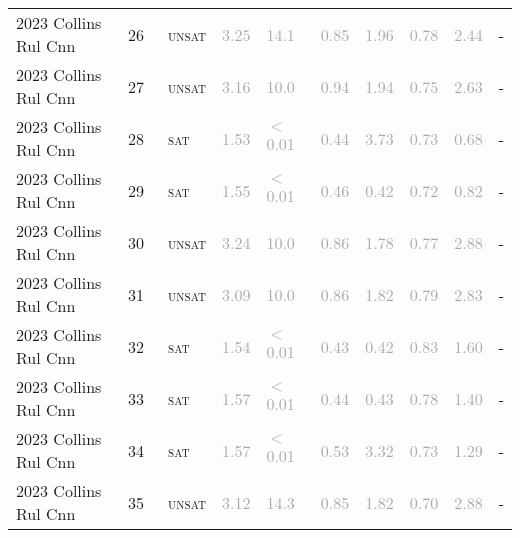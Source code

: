 \begin{center}
{\begin{longtable}{@{}llllllllll@{}}
2023 Collins Rul Cnn & 26 & ~\textsc{unsat} & \textcolor{darkgray}{3.25} & \textcolor{darkgray}{14.1} & \textcolor{darkgray}{0.85} & \textcolor{darkgray}{1.96} & \textcolor{darkgray}{0.78} & \textcolor{darkgray}{2.44} & - \\
2023 Collins Rul Cnn & 27 & ~\textsc{unsat} & \textcolor{darkgray}{3.16} & \textcolor{darkgray}{10.0} & \textcolor{darkgray}{0.94} & \textcolor{darkgray}{1.94} & \textcolor{darkgray}{0.75} & \textcolor{darkgray}{2.63} & - \\
2023 Collins Rul Cnn & 28 & ~\textsc{sat} & \textcolor{darkgray}{1.53} & \textcolor{darkgray}{$<$0.01} & \textcolor{darkgray}{0.44} & \textcolor{darkgray}{3.73} & \textcolor{darkgray}{0.73} & \textcolor{darkgray}{0.68} & - \\
2023 Collins Rul Cnn & 29 & ~\textsc{sat} & \textcolor{darkgray}{1.55} & \textcolor{darkgray}{$<$0.01} & \textcolor{darkgray}{0.46} & \textcolor{darkgray}{0.42} & \textcolor{darkgray}{0.72} & \textcolor{darkgray}{0.82} & - \\
2023 Collins Rul Cnn & 30 & ~\textsc{unsat} & \textcolor{darkgray}{3.24} & \textcolor{darkgray}{10.0} & \textcolor{darkgray}{0.86} & \textcolor{darkgray}{1.78} & \textcolor{darkgray}{0.77} & \textcolor{darkgray}{2.88} & - \\
2023 Collins Rul Cnn & 31 & ~\textsc{unsat} & \textcolor{darkgray}{3.09} & \textcolor{darkgray}{10.0} & \textcolor{darkgray}{0.86} & \textcolor{darkgray}{1.82} & \textcolor{darkgray}{0.79} & \textcolor{darkgray}{2.83} & - \\
2023 Collins Rul Cnn & 32 & ~\textsc{sat} & \textcolor{darkgray}{1.54} & \textcolor{darkgray}{$<$0.01} & \textcolor{darkgray}{0.43} & \textcolor{darkgray}{0.42} & \textcolor{darkgray}{0.83} & \textcolor{darkgray}{1.60} & - \\
2023 Collins Rul Cnn & 33 & ~\textsc{sat} & \textcolor{darkgray}{1.57} & \textcolor{darkgray}{$<$0.01} & \textcolor{darkgray}{0.44} & \textcolor{darkgray}{0.43} & \textcolor{darkgray}{0.78} & \textcolor{darkgray}{1.40} & - \\
2023 Collins Rul Cnn & 34 & ~\textsc{sat} & \textcolor{darkgray}{1.57} & \textcolor{darkgray}{$<$0.01} & \textcolor{darkgray}{0.53} & \textcolor{darkgray}{3.32} & \textcolor{darkgray}{0.73} & \textcolor{darkgray}{1.29} & - \\
2023 Collins Rul Cnn & 35 & ~\textsc{unsat} & \textcolor{darkgray}{3.12} & \textcolor{darkgray}{14.3} & \textcolor{darkgray}{0.85} & \textcolor{darkgray}{1.82} & \textcolor{darkgray}{0.70} & \textcolor{darkgray}{2.88} & - \\

\end{longtable}}
\end{center}
